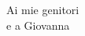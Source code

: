 \vspace*{10pc}
\thispagestyle{empty}
\begin{flushright}
\sl

Ai mie genitori\\
e a Giovanna

\end{flushright}
\par\vfill\par
